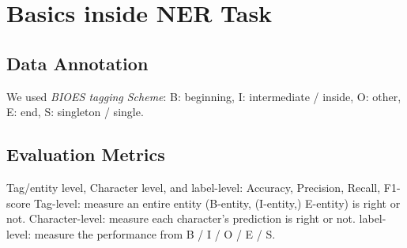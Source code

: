 \documentclass{article}
\begin{document}
\section{Basics inside NER Task}
\subsection{Data Annotation}
We used \emph{BIOES tagging Scheme}: B: beginning, I: intermediate / inside, O: other, E: end, S: singleton / single.  

\subsection{Evaluation Metrics}
Tag/entity level, Character level, and label-level: Accuracy, Precision, Recall, F1-score 
Tag-level: measure an entire entity (B-entity, (I-entity,) E-entity) is right or not.
Character-level: measure each character's prediction is right or not.
label-level: measure the performance from B / I / O / E / S.



\end{document}
